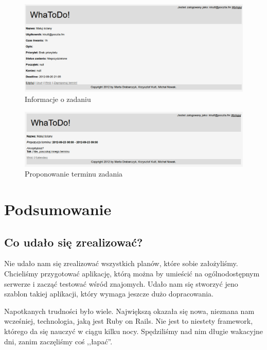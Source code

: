 \documentclass[pdflatex,11pt]{aghdpl}
\begin{document}
\begin{figure}[!h]
\centering
\includegraphics[width=\textwidth]{Informacje_o_zadaniu}
\caption{Informacje o zadaniu}
\label{fig:infoZad}
\end{figure}

\begin{figure}[!h]
\centering
\includegraphics[width=\textwidth]{Propozycja_terminu}
\caption{Proponowanie terminu zadania}
\label{fig:propozZad}
\end{figure}


\chapter{Podsumowanie}

\section{Co udało się zrealizować?}

Nie udało nam się zrealizować wszystkich planów, które sobie założyliśmy. Chcieliśmy przygotować aplikację, którą można by umieścić na ogólnodostępnym serwerze i zacząć testować wśród znajomych. Udało nam się stworzyć jeno szablon takiej aplikacji, który wymaga jeszcze dużo dopracowania.

Napotkanych trudności było wiele. Największą okazała się nowa, nieznana nam wcześniej, technologia, jaką jest Ruby on Rails. Nie jest to niestety framework, którego da się nauczyć w ciągu kilku nocy. Spędziliśmy nad nim długie wakacyjne dni, zanim zaczęliśmy coś ,,łapać''.
\end{document}
